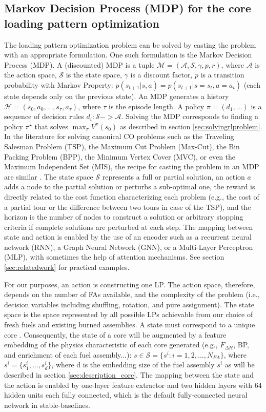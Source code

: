 \documentclass[a4paper]{article}
\begin{document}
\subsection{Markov Decision Process (MDP) for the core loading pattern optimization}
\label{sec:mdp}
The loading pattern optimization problem can be solved by casting the problem with an appropriate formulation. One such formulation is the Markov Decision Process (MDP). A (discounted) MDP is a tuple $\mathcal{M} = (\mathcal{A},\mathcal{S},\gamma,p,r)$, where $\mathcal{A}$ is the action space, $\mathcal{S}$ is the state space, $\gamma$ is a discount factor, $p$ is a transition probability with Markov Property:  $p(s_{t+1}|s,a) = p(s_{t+1} |s = s_t,a = a_t)$ (each state depends only on the previous state). An MDP generates a history $\mathcal{H} = (s_0,a_0,...,s_{\tau},a_{\tau})$, where $\tau$ is the episode length. A policy $\pi = (d_1,...)$ is a sequence of decision rules $d_i : \mathcal{S} -> \mathcal{A}$. Solving the MDP corresponds to finding a policy $\pi^{\star}$ that solves $\max_{\pi} V^{\pi}(s_0)$ as described in section \ref{sec:solvingrlproblem}. In the literature for solving canonical CO problems such as the Traveling Salesman Problem (TSP), the Maximum Cut Problem (Max-Cut), the Bin Packing Problem (BPP), the Minimum Vertex Cover (MVC), or even the Maximum Independent Set (MIS), the recipe for casting the problem in an MDP are similar \cite{mazyavkina2021reinforcement}. The state space $\mathcal{S}$ represents a full or partial solution, an action $a$ adds a node to the partial solution or perturbs a sub-optimal one, the reward is directly related to the cost function characterizing each problem (e.g., the cost of a partial tour or the difference between two tours in case of the TSP), and the horizon is the number of nodes to construct a solution or arbitrary stopping criteria if complete solutions are perturbed at each step. The mapping between state and action is enabled by the use of an encoder such as a recurrent neural network (RNN), a Graph Neural Network (GNN), or a Multi-Layer Perceptron (MLP), with sometimes the help of attention mechanisms. See section \ref{sec:relatedwork} for practical examples.

For our purposes, an action is constructing one LP. The action space, therefore, depends on the number of FAs available, and the complexity of the problem (i.e., decision variables including shuffling, rotation, and pure assignment). The state space is the space represented by all possible LPs achievable from our choice of fresh fuels and existing burned assemblies. A state must correspond to a unique core \cite{erdogan2003apwr}. Consequently, the state of a core will be augmented by a feature embedding of the physics characteristic of each core generated (e.g., $F_{\Delta H}$, BP, and enrichment of each fuel assembly...): $s \in \mathcal{S} = \{s^{i} : i = 1,2,...,N_{FA}\}$, where $s^{i} = \{s^i_1,...,s^i_d\}$, where d is the embedding size of the fuel assembly $s^i$  as will be described in section \ref{sec:description_core}. The mapping between the state and the action is enabled by one-layer feature extractor and two hidden layers with 64 hidden units each fully connected, which is the default fully-connected neural network in stable-baselines.
\end{document}
